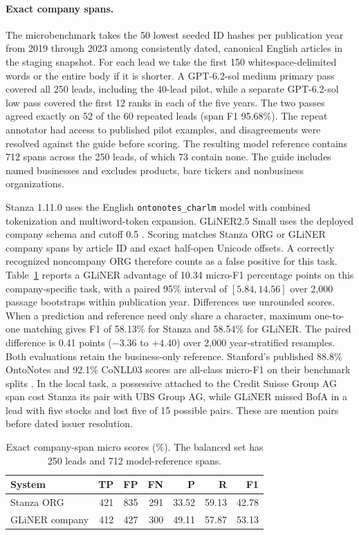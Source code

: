 \paragraph{Exact company spans.}
The microbenchmark takes the 50 lowest seeded ID hashes per
publication year from 2019 through 2023 among consistently dated,
canonical English articles in the staging snapshot. For each lead we
take the first 150 whitespace-delimited
words or the entire body if it is shorter. A GPT-6.2-sol medium primary
pass covered all 250 leads, including the 40-lead pilot, while a separate
GPT-6.2-sol low pass covered the first 12 ranks in each of the five
years. The two passes agreed exactly on 52 of the 60 repeated leads
(span F1 95.68\%). The repeat annotator had access to published pilot
examples, and disagreements were resolved against the guide before
scoring. The resulting model reference contains 712 spans across the
250 leads, of which 73 contain none. The guide includes named businesses
and excludes products, bare tickers and nonbusiness organizations.

Stanza 1.11.0 uses the English \texttt{ontonotes\_charlm} model with
combined tokenization and multiword-token expansion. GLiNER2.5 Small
uses the deployed company schema and cutoff 0.5 \citep{stanza,gliner25}.
Scoring matches Stanza ORG or GLiNER company spans by article ID and
exact half-open Unicode offsets. A correctly recognized noncompany ORG
therefore counts as a false positive for this task.
Table~\ref{tab:app-spans} reports a GLiNER advantage of 10.34
micro-F1 percentage points on this company-specific task, with a
paired 95\% interval of $[5.84,14.56]$ over 2,000 passage bootstraps
within publication year. Differences use unrounded scores. When a
prediction and reference need only share a character, maximum one-to-one
matching gives F1 of 58.13\% for Stanza and 58.54\% for GLiNER.
The paired difference is 0.41 points ($-3.36$ to $+4.40$) over 2,000
year-stratified resamples. Both evaluations retain the business-only reference.
Stanford's published 88.8\% OntoNotes and 92.1\% CoNLL03 scores are
all-class micro-F1 on their benchmark splits \citep{stanza}. In the
local task, a possessive attached to the Credit Suisse Group AG span
cost Stanza its pair with UBS Group AG, while GLiNER missed BofA in a
lead with five stocks and lost five of 15 possible pairs. These are
mention pairs before dated issuer resolution.

\begin{table}[t]
  \centering
  \small
  \setlength{\tabcolsep}{3pt}
  \caption{Exact company-span micro scores (\%). The balanced set has
  250 leads and 712 model-reference spans.}
  \label{tab:app-spans}
  \begin{tabular}{lrrrrrr}
    \toprule
    System & TP & FP & FN & P & R & F1 \\
    \midrule
    Stanza ORG & 421 & 835 & 291 & 33.52 & 59.13 & 42.78 \\
    GLiNER company & 412 & 427 & 300 & 49.11 & 57.87 & 53.13 \\
    \bottomrule
  \end{tabular}
\end{table}

